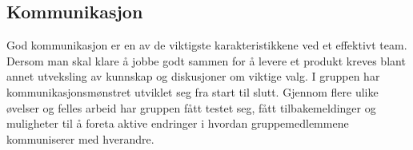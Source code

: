 \subsection{Kommunikasjon}


God kommunikasjon er en av de viktigste karakteristikkene ved et effektivt team.
Dersom man skal klare å jobbe godt sammen for å levere et produkt kreves blant annet utveksling av kunnskap og diskusjoner om viktige valg.
I gruppen har kommunikasjonsmønstret utviklet seg fra start til slutt.
Gjennom flere ulike øvelser og felles arbeid har gruppen fått testet seg, fått tilbakemeldinger og muligheter til å foreta aktive endringer i hvordan gruppemedlemmene kommuniserer med hverandre.







%

